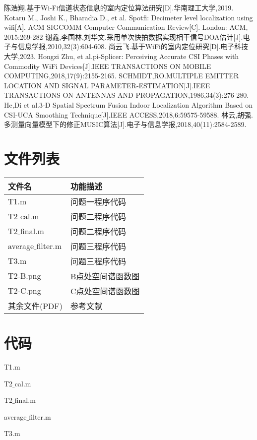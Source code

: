 \documentclass[withoutpreface,bwprint]{cumcmthesis}
\begin{document}
\newpage
\begin{thebibliography}{99}  

陈浩翔.基于Wi-Fi信道状态信息的室内定位算法研究[D].华南理工大学,2019.
Kotaru M., Joshi K., Bharadia D., et al. Spotfi: Decimeter level localization using wifi[A]. ACM SIGCOMM Computer Communication Review[C]. London: ACM, 2015:269-282
谢鑫,李国林,刘华文.采用单次快拍数据实现相干信号DOA估计[J].电子与信息学报,2010,32(3):604-608.
尚云飞.基于WiFi的室内定位研究[D].电子科技大学,2023.
 Hongzi Zhu, et al.pi-Splicer: Perceiving Accurate CSI Phases with Commodity WiFi Devices[J].IEEE TRANSACTIONS ON MOBILE COMPUTING,2018,17(9):2155-2165.
SCHMIDT,RO.MULTIPLE EMITTER LOCATION AND SIGNAL PARAMETER-ESTIMATION[J].IEEE TRANSACTIONS ON ANTENNAS AND PROPAGATION,1986,34(3):276-280.
He,Di et al.3-D Spatial Spectrum Fusion Indoor Localization Algorithm Based on CSI-UCA Smoothing Technique[J].IEEE ACCESS,2018,6:59575-59588.
林云,胡强.多测量向量模型下的修正MUSIC算法[J].电子与信息学报,2018,40(11):2584-2589.

\end{thebibliography}
\newpage
\begin{appendices}
\section{文件列表}
\begin{table}[H]
\centering
\begin{tabularx}{\textwidth}{LL}
\toprule
文件名   & 功能描述 \\
\midrule
T1.m & 问题一程序代码 \\
T2$\_$cal.m & 问题二程序代码 \\
T2$\_$final.m & 问题二程序代码 \\
average$\_$filter.m & 问题三程序代码 \\
T3.m & 问题三程序代码 \\
T2-B.png & B点处空间谱函数图 \\
T2-C.png & C点处空间谱函数图 \\
其余文件(PDF) & 参考文献 \\
\bottomrule
\end{tabularx}
\label{tab:文件列表}
\end{table}

\section{代码}
\noindent T1.m

T2$\_$cal.m

T2$\_$final.m

average$\_$filter.m

T3.m


\end{appendices}
\end{document}
